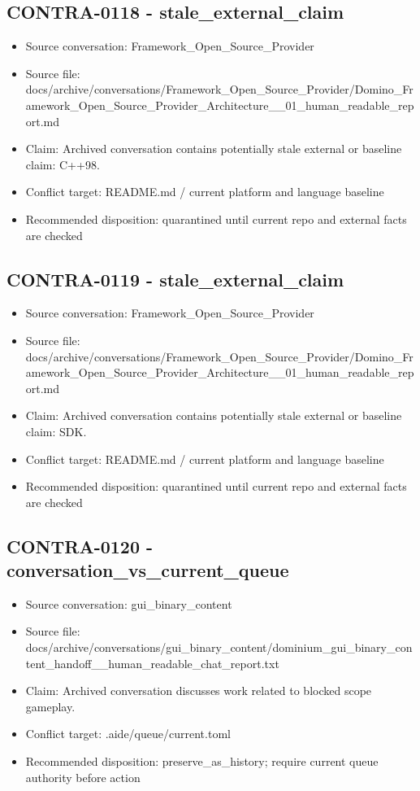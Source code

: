 \documentclass[11pt,a4paper]{report}
\begin{document}
\subsection{CONTRA-0118 - stale\_external\_claim}

\begin{itemize}
\item Source conversation: Framework\_Open\_Source\_Provider
\item Source file: docs/archive/conversations/Framework\_Open\_Source\_Provider/Domino\_Framework\_Open\_Source\_Provider\_Architecture\_\_01\_human\_readable\_report.md
\item Claim: Archived conversation contains potentially stale external or baseline claim: C++98.
\item Conflict target: README.md / current platform and language baseline
\item Recommended disposition: quarantined until current repo and external facts are checked
\end{itemize}

\subsection{CONTRA-0119 - stale\_external\_claim}

\begin{itemize}
\item Source conversation: Framework\_Open\_Source\_Provider
\item Source file: docs/archive/conversations/Framework\_Open\_Source\_Provider/Domino\_Framework\_Open\_Source\_Provider\_Architecture\_\_01\_human\_readable\_report.md
\item Claim: Archived conversation contains potentially stale external or baseline claim: SDK.
\item Conflict target: README.md / current platform and language baseline
\item Recommended disposition: quarantined until current repo and external facts are checked
\end{itemize}

\subsection{CONTRA-0120 - conversation\_vs\_current\_queue}

\begin{itemize}
\item Source conversation: gui\_binary\_content
\item Source file: docs/archive/conversations/gui\_binary\_content/dominium\_gui\_binary\_content\_handoff\_\_human\_readable\_chat\_report.txt
\item Claim: Archived conversation discusses work related to blocked scope gameplay.
\item Conflict target: .aide/queue/current.toml
\item Recommended disposition: preserve\_as\_history; require current queue authority before action
\end{itemize}
\end{document}
